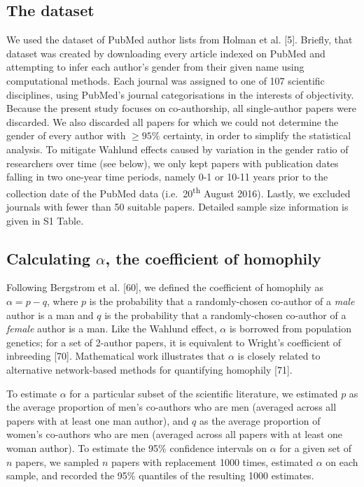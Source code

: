 \documentclass[12pt,]{article}
\begin{document}
\subsection{The dataset}\label{the-dataset}

We used the dataset of PubMed author lists from Holman et al. {[}5{]}.
Briefly, that dataset was created by downloading every article indexed
on PubMed and attempting to infer each author's gender from their given
name using computational methods. Each journal was assigned to one of
107 scientific disciplines, using PubMed's journal categorisations in
the interests of objectivity. Because the present study focuses on
co-authorship, all single-author papers were discarded. We also
discarded all papers for which we could not determine the gender of
every author with \({\ge}95\%\) certainty, in order to simplify the
statistical analysis. To mitigate Wahlund effects caused by variation in
the gender ratio of researchers over time (see below), we only kept
papers with publication dates falling in two one-year time periods,
namely 0-1 or 10-11 years prior to the collection date of the PubMed
data (i.e.~20\textsuperscript{th} August 2016). Lastly, we excluded
journals with fewer than 50 suitable papers. Detailed sample size
information is given in S1 Table.

\subsection{\texorpdfstring{Calculating \(\alpha\), the coefficient of
homophily}{Calculating \textbackslash{}alpha, the coefficient of homophily}}\label{calculating-alpha-the-coefficient-of-homophily}

Following Bergstrom et al. {[}60{]}, we defined the coefficient of
homophily as \(\alpha = p - q\), where \(p\) is the probability that a
randomly-chosen co-author of a \emph{male} author is a man and \(q\) is
the probability that a randomly-chosen co-author of a \emph{female}
author is a man. Like the Wahlund effect, \(\alpha\) is borrowed from
population genetics; for a set of 2-author papers, it is equivalent to
Wright's coefficient of inbreeding {[}70{]}. Mathematical work
illustrates that \(\alpha\) is closely related to alternative
network-based methods for quantifying homophily {[}71{]}.

To estimate \(\alpha\) for a particular subset of the scientific
literature, we estimated \(p\) as the average proportion of men's
co-authors who are men (averaged across all papers with at least one man
author), and \(q\) as the average proportion of women's co-authors who
are men (averaged across all papers with at least one woman author). To
estimate the 95\% confidence intervals on \(\alpha\) for a given set of
\(n\) papers, we sampled \(n\) papers with replacement 1000 times,
estimated \(\alpha\) on each sample, and recorded the 95\% quantiles of
the resulting 1000 estimates.
\end{document}
